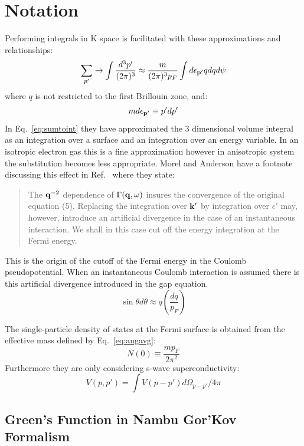 \section{Notation}
%
Performing integrals in K space is facilitated with these approximations
and relationships:
%
\begin{equation}
\label{eq:sumtoint}
\sum_{p'} \rightarrow \int \frac{d^{3}p'}{(2\pi)^{3}} 
\approx \frac{m}{(2\pi)^{3}p_{F}}\int d\epsilon_{{\bf p}'}q dq d\psi
\end{equation}
%
%
where $q$ is not restricted to the first Brillouin zone, and:
\begin{equation}
m d\epsilon_{{\bf p}'} \equiv p'dp'
\end{equation}
%
In Eq.~\ref{eq:sumtoint} they have approximated the 3 dimensional
volume integral as an integration over a surface and an integration
over an energy variable. In an isotropic electron gas this is a fine
approximation however in anisotropic system the substitution becomes
less appropriate.
Morel and Anderson have a footnote discussing this effect in Ref.~\cite{morel62}
where they state:
\begin{quote}
The ${\bf q}^{-2}$ dependence of $\Gamma({\bf q},\omega)$ insures the convergence of the original equation (5).
Replacing the integration over ${\bf k}'$ by integration over $\epsilon'$ may, however, introduce an artificial divergence
in the case of an instantaneous interaction. We shall in this case cut off
the energy integration at the Fermi energy.
\end{quote}
%
This is the origin of the cutoff of the Fermi 
energy in the Coulomb pseudopotential. When an 
instantaneous Coulomb interaction is assumed there 
is this artificial divergence introduced in 
the gap equation.
%
\begin{equation}
\label{eq:angavg}
\sin\theta d\theta \approx q(\frac{dq}{p_{F}})
\end{equation}

The single-particle density of states at the Fermi
surface is obtained from the effective mass defined by
Eq.~\ref{eq:angavg}:
%
\begin{equation}
N(0) \equiv \frac{m p_{F}}{2\pi^{2}}
\end{equation}
%
Furthermore they are only considering s-wave superconductivity:
%
\begin{equation}
V(p,p') = \int V(p-p')d\Omega_{p-p'}/4\pi
\end{equation}
%
\subsection{Green's Function in Nambu Gor'Kov Formalism}

